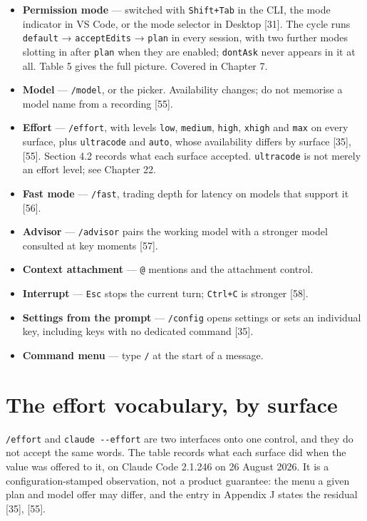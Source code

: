 \documentclass[11pt,a4paper,twoside,openany]{book}
\begin{document}
\begin{itemize}
\item \textbf{Permission mode} — switched with \texttt{Shift+Tab} in the CLI, the mode indicator in VS Code, or the mode selector in Desktop [31]. The cycle runs \texttt{default} → \texttt{accept\allowbreak{}Edits} → \texttt{plan} in every session, with two further modes slotting in after \texttt{plan} when they are enabled; \texttt{dont\allowbreak{}Ask} never appears in it at all. Table 5 gives the full picture. Covered in Chapter 7.
\item \textbf{Model} — \texttt{/\allowbreak{}model}, or the picker. Availability changes; do not memorise a model name from a recording [55].
\item \textbf{Effort} — \texttt{/\allowbreak{}effort}, with levels \texttt{low}, \texttt{medium}, \texttt{high}, \texttt{xhigh} and \texttt{max} on every surface, plus \texttt{ultracode} and \texttt{auto}, whose availability differs by surface [35], [55]. Section 4.2 records what each surface accepted. \texttt{ultracode} is not merely an effort level; see Chapter 22.
\item \textbf{Fast mode} — \texttt{/\allowbreak{}fast}, trading depth for latency on models that support it [56].
\item \textbf{Advisor} — \texttt{/\allowbreak{}advisor} pairs the working model with a stronger model consulted at key moments [57].
\item \textbf{Context attachment} — \texttt{@} mentions and the attachment control.
\item \textbf{Interrupt} — \texttt{Esc} stops the current turn; \texttt{Ctrl+C} is stronger [58].
\item \textbf{Settings from the prompt} — \texttt{/\allowbreak{}config} opens settings or sets an individual key, including keys with no dedicated command [35].
\item \textbf{Command menu} — type \texttt{/\allowbreak{}} at the start of a message.
\end{itemize}

\FloatBarrier
\setcounter{section}{1}
\section{The effort vocabulary, by surface}

\texttt{/\allowbreak{}effort} and \texttt{claude -\allowbreak{}-\allowbreak{}effort} are two interfaces onto one control, and they do not accept the same words. The table records what each surface did when the value was offered to it, on Claude Code 2.1.246 on 26 August 2026. It is a configuration-stamped observation, not a product guarantee: the menu a given plan and model offer may differ, and the entry in Appendix J states the residual [35], [55].
\end{document}
